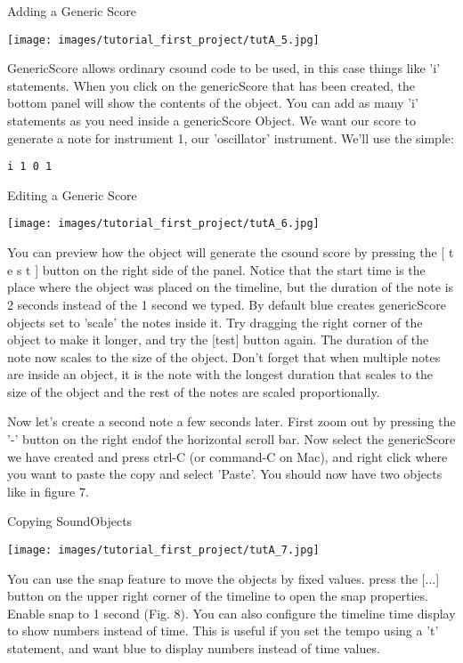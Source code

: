 Adding a Generic Score

\texttt{[image: images/tutorial\_first\_project/tutA\_5.jpg]}

GenericScore allows ordinary csound code to be used, in this case things
like 'i' statements. When you click on the genericScore that has been
created, the bottom panel will show the contents of the object. You can
add as many 'i' statements as you need inside a genericScore Object. We
want our score to generate a note for instrument 1, our 'oscillator'
instrument. We'll use the simple:

\begin{verbatim}
i 1 0 1
\end{verbatim}

Editing a Generic Score

\texttt{[image: images/tutorial\_first\_project/tutA\_6.jpg]}

You can preview how the object will generate the csound score by
pressing the {[} t e s t {]} button on the right side of the panel.
Notice that the start time is the place where the object was placed on
the timeline, but the duration of the note is 2 seconds instead of the 1
second we typed. By default blue creates genericScore objects set to
'scale' the notes inside it. Try dragging the right corner of the object
to make it longer, and try the {[}test{]} button again. The duration of
the note now scales to the size of the object. Don't forget that when
multiple notes are inside an object, it is the note with the longest
duration that scales to the size of the object and the rest of the notes
are scaled proportionally.

Now let's create a second note a few seconds later. First zoom out by
pressing the '-' button on the right endof the horizontal scroll bar.
Now select the genericScore we have created and press ctrl-C (or
command-C on Mac), and right click where you want to paste the copy and
select 'Paste'. You should now have two objects like in figure 7.

Copying SoundObjects

\texttt{[image: images/tutorial\_first\_project/tutA\_7.jpg]}

You can use the snap feature to move the objects by fixed values. press
the {[}...{]} button on the upper right corner of the timeline to open
the snap properties. Enable snap to 1 second (Fig. 8). You can also
configure the timeline time display to show numbers instead of time.
This is useful if you set the tempo using a 't' statement, and want blue
to display numbers instead of time values.


